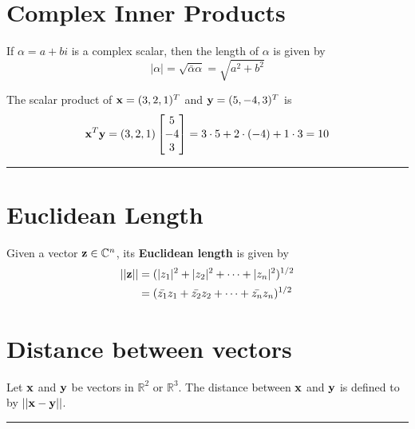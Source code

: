 \section{Complex Inner Products}

\begin{definition}
	If $\alpha = a+bi$ is a complex scalar, then the length of $\alpha$ is given by
	\[  | \alpha | = \sqrt{ \bar{\alpha} \alpha } = \sqrt{a^2 + b^2 } \]
\end{definition}
 
 
 \begin{example}
 	The scalar product of ${\bf x} = (3, 2, 1)^T$ and ${\bf y} = (5, -4, 3)^T$ is
		\[ {\bf x}^T {\bf y} = (3, 2, 1) \begin{bmatrix} 5 \\ -4 \\3 \end{bmatrix} = 3 \cdot 5 + 2 \cdot (-4) + 1 \cdot 3 = 10 \]
 \end{example}

\rule[0.01in]{\textwidth}{0.0025in}



\section{Euclidean Length}

Given a vector ${\bf z} \in \mathbb{C}^n$, its \textbf{Euclidean length} is given by
\begin{align*}
 || {\bf z} || &= (|z_1|^2 + |z_2|^2 + \cdots + |z_n|^2)^{1/2}\\
 &= (\bar{z_1} z_1 + \bar{z_2} z_2 + \cdots + \bar{z_n} z_n)^{1/2}\\
 \end{align*}







\section{Distance between vectors}


\begin{definition}
	Let ${\bf x}$ and ${\bf y}$  be vectors in $\mathbb{R}^2$ or $\mathbb{R}^3$.  The distance between ${\bf x}$ and ${\bf y}$ is defined to by $|| {\bf x} - {\bf y} ||$.
	
\end{definition}
\rule[0.01in]{\textwidth}{0.0025in}






